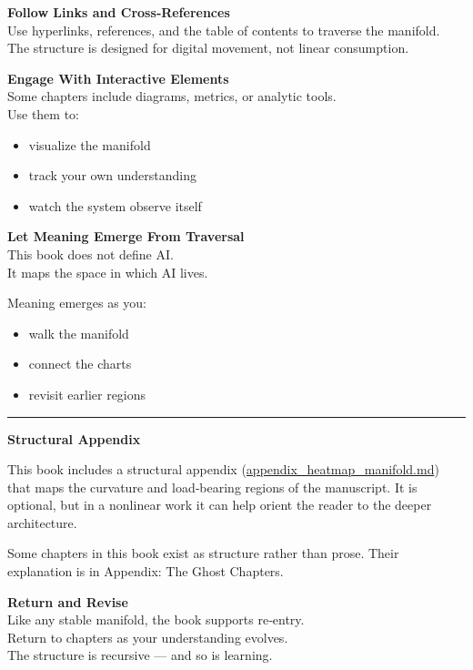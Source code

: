 \textbf{Follow Links and Cross‑References}\\
Use hyperlinks, references, and the table of contents to traverse the
manifold.\\
The structure is designed for digital movement, not linear consumption.

\textbf{Engage With Interactive Elements}\\
Some chapters include diagrams, metrics, or analytic tools.\\
Use them to:

\begin{itemize}
\tightlist
\item
  visualize the manifold
\item
  track your own understanding
\item
  watch the system observe itself
\end{itemize}

\textbf{Let Meaning Emerge From Traversal}\\
This book does not define AI.\\
It maps the space in which AI lives.

Meaning emerges as you:

\begin{itemize}
\tightlist
\item
  walk the manifold
\item
  connect the charts
\item
  revisit earlier regions
\end{itemize}

\begin{center}\rule{0.5\linewidth}{0.5pt}\end{center}

\textbf{Structural Appendix}

This book includes a structural appendix
(\url{appendix_heatmap_manifold.md}) that maps the curvature and
load‑bearing regions of the manuscript. It is optional, but in a
nonlinear work it can help orient the reader to the deeper architecture.

Some chapters in this book exist as structure rather than prose. Their
explanation is in Appendix: The Ghost Chapters.

\textbf{Return and Revise}\\
Like any stable manifold, the book supports re‑entry.\\
Return to chapters as your understanding evolves.\\
The structure is recursive --- and so is learning.

